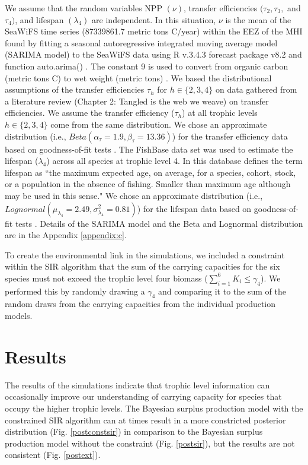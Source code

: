 \documentclass[oneside,12pt,final]{sty/ucthesis-CA2012}
\let\cite\citep                             %
\begin{document}
\begin{mainmatter}
We assume that the random variables NPP $(\nu)$, transfer efficiencies $(\tau_2, \tau_3,$ and $\tau_4)$, and lifespan $(\lambda_4)$ are independent. In this situation, $\nu$ is the mean of the SeaWiFS time series (87339861.7 metric tons C/year) within the EEZ of the MHI found by fitting a seasonal autoregressive integrated moving average model (SARIMA model) to the SeaWiFS data using R v.3.4.3 \cite{Rcite} forecast package v8.2 and function auto.arima() \cite{forecast1, forecast2}. The constant 9 is used to convert from organic carbon (metric tons C) to wet weight (metric tons) \cite{strathmann1967estimating, pauly1995primary, chassot2010global}. We based the distributional assumptions of the transfer efficiencies $\tau_h$ for $h \in \{2, 3, 4\}$ on data gathered from a literature review (Chapter 2: Tangled is the web we weave) on transfer efficiencies. We assume the transfer efficiency ($\tau_h$) at all trophic levels $h \in \{2, 3, 4\}$ come from the same distribution. We chose an approximate distribution (i.e., $Beta(\alpha_\tau=1.9, \beta_{\tau}=13.36)$) for the transfer efficiency data based on goodness-of-fit tests \cite{fitdistrplus}. The \citet{fishbase} FishBase data set was used to estimate the lifespan ($\lambda_4$) across all species at trophic level 4. In this database \citet{fishbase} defines the term lifespan as ``the maximum expected age, on average, for a species, cohort, stock, or a population in the absence of fishing. Smaller than maximum age although may be used in this sense." We chose an approximate distribution (i.e., $Lognormal(\mu_{\lambda_4}=2.49, \sigma^2_{\lambda_4}=0.81)$) for the lifespan data based on goodness-of-fit tests \cite{fitdistrplus}. Details of the SARIMA model and the Beta and Lognormal distribution are in the Appendix \ref{appendix:c}. 

\vspace{5mm}

To create the environmental link in the simulations, we included a constraint within the SIR algorithm that the sum of the carrying capacities for the six species must not exceed the trophic level four biomass ($\sum_{i=1}^{6} K_i \le \gamma_4$). We performed this by randomly drawing a $\gamma_4$ and comparing it to the sum of the random draws from the carrying capacities from the individual production models.


\section*{Results}
The results of the simulations  indicate that trophic level information can occasionally improve our understanding of carrying capacity for species that occupy the higher trophic levels. The Bayesian surplus production model with the constrained SIR algorithm can at times result in a more constricted posterior distribution (Fig. \ref{postconstsir}) in comparison to the Bayesian surplus production model without the constraint (Fig. \ref{postsir}), but the results are not consistent (Fig. \ref{postext}). 


\end{mainmatter}
\end{document}
